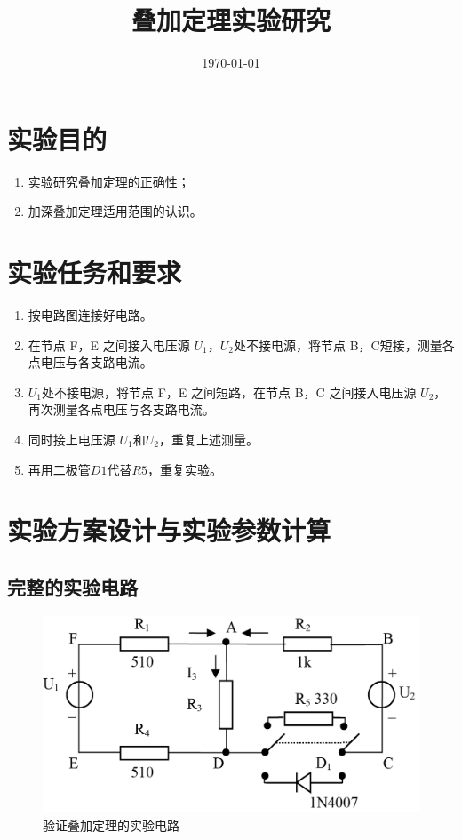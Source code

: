 \documentclass{../source/Experiment}
\title{叠加定理实验研究}
\date{\today}
\begin{document}
    \makecover
    \makeheader

    \section{实验目的}
        \begin{enumerate}
            \item 实验研究叠加定理的正确性；
            \item 加深叠加定理适用范围的认识。 
        \end{enumerate}
    \section{实验任务和要求}
        \begin{enumerate}
            \item 按电路图连接好电路。
            \item 在节点 F，E 之间接入电压源 $U_1$，$U_2$处不接电源，将节点 B，C短接，测量各点电压与各支路电流。
            \item $U_1$处不接电源，将节点 F，E 之间短路，在节点 B，C 之间接入电压源 $U_2$，再次测量各点电压与各支路电流。
            \item 同时接上电压源 $U_1$和$U_2$，重复上述测量。
            \item 再用二极管$D1$代替$R5$，重复实验。 
        \end{enumerate}
    \section{实验方案设计与实验参数计算}
        \subsection{完整的实验电路}
            \begin{figure}[htbp]
                \begin{center}
                    \includegraphics{pic/pic2.png}
                    \caption{验证叠加定理的实验电路}
                \end{center}
            \end{figure}
\end{document}
